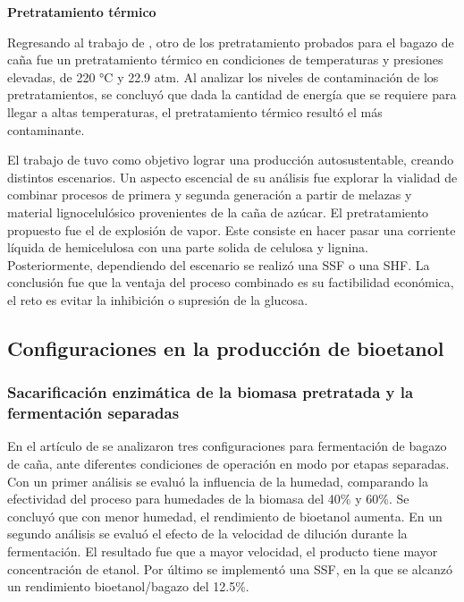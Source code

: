\documentclass[12pt]{article}
\begin{document}

\textbf{Pretratamiento térmico } 


Regresando al trabajo de \cite{rojas2010analisis}, otro de los pretratamiento probados para el bagazo de caña fue un pretratamiento térmico en condiciones de temperaturas y presiones elevadas, de 220 °C y 22.9 atm. Al analizar los niveles de contaminación de los pretratamientos, se concluyó que dada la cantidad de energía que se requiere para llegar a altas temperaturas, el pretratamiento térmico resultó el más contaminante.

El trabajo de \cite{MOONSAMY2022115675} tuvo como objetivo lograr una producción autosustentable, creando distintos escenarios. Un aspecto escencial de su análisis fue explorar la vialidad de combinar procesos de primera y segunda generación a partir de melazas y material lignocelulósico provenientes de la caña de azúcar. El pretratamiento propuesto fue el de explosión de vapor. Este consiste en hacer pasar una corriente líquida de hemicelulosa con una parte solida de celulosa y lignina. Posteriormente, dependiendo del escenario se realizó una SSF o una SHF. La conclusión fue que la ventaja del proceso combinado es su factibilidad económica, el reto es evitar la inhibición o supresión de la glucosa.

\subsection{Configuraciones en la producción de bioetanol}



\subsubsection{Sacarificación enzimática de la biomasa pretratada y la fermentación separadas} 

En el artículo de \cite{Gomes2022analisis} se analizaron tres configuraciones para fermentación de bagazo de caña, ante diferentes condiciones de operación en modo por etapas separadas. Con un primer análisis se evaluó la influencia de la humedad, comparando la efectividad del proceso para humedades de la biomasa del 40\% y 60\%. Se concluyó que con menor humedad, el rendimiento de bioetanol aumenta. En un segundo análisis se evaluó el efecto de la velocidad de dilución durante la fermentación. El resultado fue que a mayor velocidad, el producto tiene mayor concentración de etanol. Por último se implementó una SSF, en la que se alcanzó un rendimiento bioetanol/bagazo del 12.5\%. 
\end{document}
